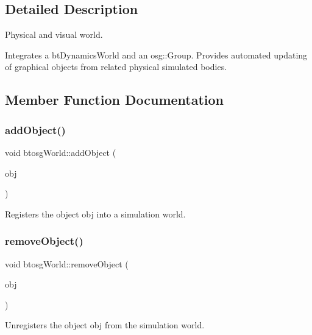 \subsection{Detailed Description}
Physical and visual world. 

Integrates a bt\+Dynamics\+World and an osg\+::\+Group. Provides automated updating of graphical objects from related physical simulated bodies. 

\subsection{Member Function Documentation}
\mbox{\label{classbtosgWorld_ae5b71c6319dd420479096a265a1725b7}} 
\subsubsection{\texorpdfstring{addObject()}{addObject()}}
{\footnotesize\ttfamily void btosg\+World\+::add\+Object (\begin{DoxyParamCaption}\item[{class \mbox{\hyperlink{classbtosgObject}{btosg\+Object}} $\ast$}]{obj }\end{DoxyParamCaption})}

Registers the object obj into a simulation world. \mbox{\label{classbtosgWorld_a09e7791013d2c3a63bb0fb5d96396a4f}} 
\subsubsection{\texorpdfstring{removeObject()}{removeObject()}}
{\footnotesize\ttfamily void btosg\+World\+::remove\+Object (\begin{DoxyParamCaption}\item[{class \mbox{\hyperlink{classbtosgObject}{btosg\+Object}} $\ast$}]{obj }\end{DoxyParamCaption})}

Unregisters the object obj from the simulation world. \mbox{\label{classbtosgWorld_a6af4d066410a86b44fff5563667ea9a9}} 
